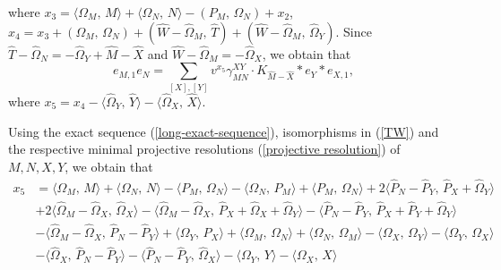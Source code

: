 \documentclass[reqno,12pt]{amsart}
\numberwithin{equation}{section}
\theoremstyle{plain}
\theoremstyle{definition}
\begin{document}
where
$x_3={\langle {\Omega_M,\,M}\rangle}+{\langle {\Omega_N,\,N}\rangle}-(P_M,\,\Omega_N)+x_2$,
$x_4=x_3+(\Omega_M,\,\Omega_N)+(\hat{W}-\hat{\Omega}_M,\,\hat{T})+(\hat{W}-\hat{\Omega}_M,\,\hat{\Omega}_Y)$.
Since $\hat{T}-\hat{\Omega}_N=-\hat{\Omega}_Y+\hat{M}-\hat{X}$ and $\hat{W}-\hat{\Omega}_M=-\hat{\Omega}_X$, we obtain that
$$e_{M,1}e_N=\sum\limits_{[X],[Y]}v^{x_5}\gamma_{MN}^{XY}\cdot
K_{\hat{M}-\hat{X}}\ast e_Y\ast e_{X,1},$$ where
$x_5=x_4-{\langle {\hat{\Omega}_Y,\,\hat{Y}}\rangle}-{\langle {\hat{\Omega}_X,\,\hat{X}}\rangle}$.

Using the exact sequence (\ref{long-exact-sequence}), isomorphisms in (\ref{TW}) and the respective minimal projective resolutions (\ref{projective resolution}) of $M,N,X,Y$, we obtain that
\begin{equation*}\begin{split}
x_5&={\langle {\Omega_M,\,M}\rangle}+{\langle {\Omega_N,\,N}\rangle}-{\langle {P_M,\,\Omega_N}\rangle}-{\langle {\Omega_N,\,P_M}\rangle}+{\langle {P_M,\,\Omega_N}\rangle}
+2{\langle {\hat{P}_N-\hat{P}_Y,\,\hat{P}_X+\hat{\Omega}_Y}\rangle}\\&+
2{\langle {\hat{\Omega}_M-\hat{\Omega}_X,\,\hat{\Omega}_X}\rangle}-{\langle {\hat{\Omega}_M-\hat{\Omega}_X,\,\hat{P}_X+\hat{\Omega}_X+\hat{\Omega}_Y}\rangle}
-{\langle {\hat{P}_N-\hat{P}_Y,\,\hat{P}_X+\hat{P}_Y+\hat{\Omega}_Y}\rangle}\\&
-{\langle {\hat{\Omega}_M-\hat{\Omega}_X,\,\hat{P}_N-\hat{P}_Y}\rangle}+{\langle {{\Omega}_Y,\,{P}_X}\rangle}+{\langle {{\Omega}_M,\,{\Omega}_N}\rangle}+{\langle {{\Omega}_N,\,{\Omega}_M}\rangle}-{\langle {{\Omega}_X,\,{\Omega}_Y}\rangle}-{\langle {{\Omega}_Y,\,{\Omega}_X}\rangle}\\
&-{\langle {\hat{\Omega}_X,\,\hat{P}_N-\hat{P}_Y}\rangle}-{\langle {\hat{P}_N-\hat{P}_Y,\,\hat{\Omega}_X}\rangle}-{\langle {{\Omega}_Y,\,Y}\rangle}-{\langle {{\Omega}_X,\,X}\rangle}
\end{split}
\end{equation*}
\vspace{-0.6em}
\end{document}
